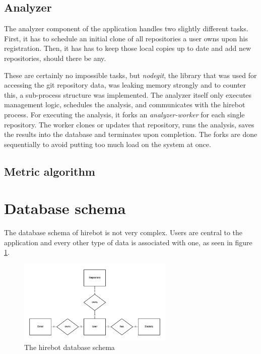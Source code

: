 \subsection{Analyzer}
The analyzer component of the application handles two slightly different
tasks. First, it has to schedule an initial clone of all repositories
a user owns upon his registration. Then, it has has to keep those local
copies up to date and add new repositories, should there be any.
\newline

These are certainly no impossible tasks, but \textit{nodegit}, the library
that was used for accessing the git repository data, was
leaking memory strongly and to counter this, a sub-process structure was
implemented. The analyzer itself only executes management logic,
schedules the analysis, and communicates with the hirebot process.
For executing the analysis, it forks an \textit{analyzer-worker} for each
single repository. The worker clones or updates that repository,
runs the analysis, saves the results into the database and terminates
upon completion. The forks are done sequentially to avoid putting
too much load on the system at once.

\subsection{Metric algorithm}

\section{Database schema}
The database schema of hirebot is not very complex.
Users are central to the application and every other type of data
is associated with one, as seen in figure \ref{fig:schema}.

\begin{figure}
  \centering
  \includegraphics[width=20em]{gfx/schema.png}
  \caption{The hirebot database schema}
  \label{fig:schema}
\end{figure}